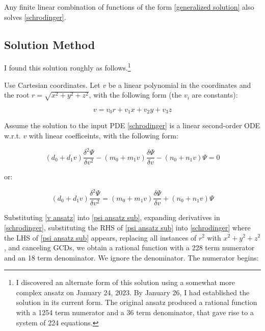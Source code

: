 \documentclass{article}
\begin{document}
Any finite linear combination of functions of the form \eqref{generalized solution} also solves \eqref{schrodinger}.

\subsection*{Solution Method}


I found this solution roughly as follows.\footnote{
I discovered an alternate form of this solution using a somewhat more complex ansatz
on January 24, 2023.  By January 26, I had established the solution in its current form.
The original ansatz produced a rational function with
a 1254 term numerator and a 36 term denominator, that gave rise to a system of 224 equations.
}

Use Cartesian coordinates.  Let $v$ be a linear polynomial in the coordinates and the root $r=\sqrt{x^2+y^2+z^2}$,
with the following form (the $v_i$ are constants):

\begin{equation}
\label{v ansatz}
v = v_0 r + v_1 x + v_2 y + v_3 z
\end{equation}

Assume the solution to the input PDE \eqref{schrodinger}
is a linear second-order ODE w.r.t. $v$ with linear coefficeints,
with the following form:

\begin{equation}
\label{psi ansatz}
(d_0 + d_1 v) \frac{\delta^2\Psi}{\delta v^2} - (m_0 + m_1 v) \frac{\delta\Psi}{\delta v} - (n_0 + n_1 v) \Psi = 0
\end{equation}

or:

\begin{equation}
\label{psi ansatz sub}
(d_0 + d_1 v) \frac{\delta^2\Psi}{\delta v^2} = (m_0 + m_1 v) \frac{\delta\Psi}{\delta v} + (n_0 + n_1 v) \Psi
\end{equation}

Substituting \eqref{v ansatz} into \eqref{psi ansatz sub}, expanding derivatives in \eqref{schrodinger},
substituting the RHS of \eqref{psi ansatz sub} into \eqref{schrodinger} where the LHS of
\eqref{psi ansatz sub} appears,
replacing all instances of $r^2$ with $x^2+y^2+z^2$, and canceling GCDs, we obtain a rational function
with a 228 term numerator and an 18 term denominator.  We ignore the denominator.  The numerator begins:
\end{document}
